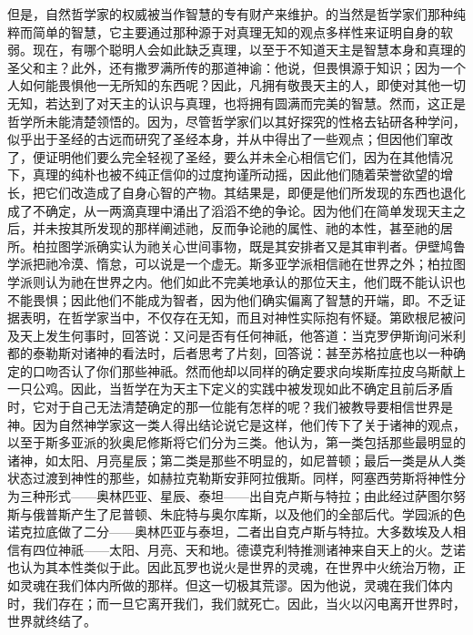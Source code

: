 但是，自然哲学家的权威被当作智慧的专有财产来维护。的当然是哲学家们那种纯粹而简单的智慧，它主要通过那种源于对真理无知的观点多样性来证明自身的软弱。现在，有哪个聪明人会如此缺乏真理，以至于不知道天主是智慧本身和真理的圣父和主？此外，还有撒罗满所传的那道神谕：他说，但畏惧源于知识；因为一个人如何能畏惧他一无所知的东西呢？因此，凡拥有敬畏天主的人，即使对其他一切无知，若达到了对天主的认识与真理，也将拥有圆满而完美的智慧。然而，这正是哲学所未能清楚领悟的。因为，尽管哲学家们以其好探究的性格去钻研各种学问，似乎出于圣经的古远而研究了圣经本身，并从中得出了一些观点；但因他们窜改了，便证明他们要么完全轻视了圣经，要么并未全心相信它们，因为在其他情况下，真理的纯朴也被不纯正信仰的过度拘谨所动摇，因此他们随着荣誉欲望的增长，把它们改造成了自身心智的产物。其结果是，即便是他们所发现的东西也退化成了不确定，从一两滴真理中涌出了滔滔不绝的争论。因为他们在简单发现天主之后，并未按其所发现的那样阐述祂，反而争论祂的属性、祂的本性，甚至祂的居所。柏拉图学派确实认为祂关心世间事物，既是其安排者又是其审判者。伊壁鸠鲁学派把祂冷漠、惰怠，可以说是一个虚无。斯多亚学派相信祂在世界之外；柏拉图学派则认为祂在世界之内。他们如此不完美地承认的那位天主，他们既不能认识也不能畏惧；因此他们不能成为智者，因为他们确实偏离了智慧的开端，即。不乏证据表明，在哲学家当中，不仅存在无知，而且对神性实际抱有怀疑。第欧根尼被问及天上发生何事时，回答说：又问是否有任何神祇，他答道：当克罗伊斯询问米利都的泰勒斯对诸神的看法时，后者思考了片刻，回答说：甚至苏格拉底也以一种确定的口吻否认了你们那些神祇。然而他却以同样的确定要求向埃斯库拉皮乌斯献上一只公鸡。因此，当哲学在为天主下定义的实践中被发现如此不确定且前后矛盾时，它对于自己无法清楚确定的那一位能有怎样的呢？我们被教导要相信世界是神。因为自然神学家这一类人得出结论说它是这样，他们传下了关于诸神的观点，以至于斯多亚派的狄奥尼修斯将它们分为三类。他认为，第一类包括那些最明显的诸神，如太阳、月亮星辰；第二类是那些不明显的，如尼普顿；最后一类是从人类状态过渡到神性的那些，如赫拉克勒斯安菲阿拉俄斯。同样，阿塞西劳斯将神性分为三种形式——奥林匹亚、星辰、泰坦——出自克卢斯与特拉；由此经过萨图尔努斯与俄普斯产生了尼普顿、朱庇特与奥尔库斯，以及他们的全部后代。学园派的色诺克拉底做了二分——奥林匹亚与泰坦，二者出自克卢斯与特拉。大多数埃及人相信有四位神祇——太阳、月亮、天和地。德谟克利特推测诸神来自天上的火。芝诺也认为其本性类似于此。因此瓦罗也说火是世界的灵魂，在世界中火统治万物，正如灵魂在我们体内所做的那样。但这一切极其荒谬。因为他说，灵魂在我们体内时，我们存在；而一旦它离开我们，我们就死亡。因此，当火以闪电离开世界时，世界就终结了。\par

